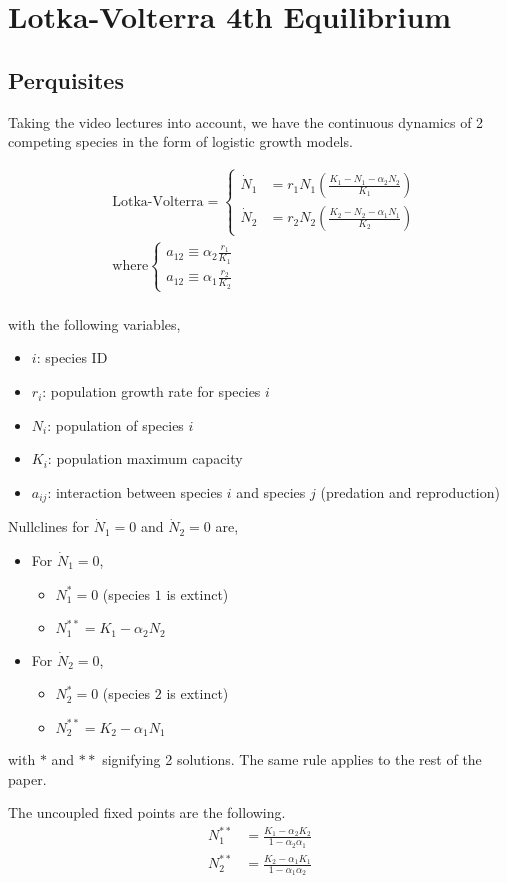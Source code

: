 \section{Lotka-Volterra 4th Equilibrium}
\subsection{Perquisites}
Taking the video lectures into account, we have the continuous dynamics of 2 competing species in the form of logistic growth models.

\begin{equation}
  \begin{split}
    &\text{Lotka-Volterra} =
    \begin{cases}
      \dot N_1 &= r_1 N_1 \left( \frac {K_1 - N_1 - \alpha_2 N_2} {K_1} \right) \\
      \dot N_2 &= r_2 N_2 \left( \frac {K_2 - N_2 - \alpha_1 N_1} {K_2} \right)
    \end{cases} \\
    &\text{where}
    \begin{cases}
      a_{12} \equiv \alpha_2 \frac {r_1} {K_1} \\
      a_{12} \equiv \alpha_1 \frac {r_2} {K_2}
    \end{cases} \\
  \end{split}
\end{equation}

with the following variables,

\begin{itemize}
  \item $i$: species ID
  \item $r_i$: population growth rate for species $i$
  \item $N_i$: population of species $i$
  \item $K_i$: population maximum capacity
  \item $a_{ij}$: interaction between species $i$ and species $j$
  (predation and reproduction)
\end{itemize}

Nullclines for $\dot N_1 = 0$ and $\dot N_2 = 0$ are,
\begin{itemize}
  \item [] For $\dot N_1 = 0$,
  \begin{itemize}
    \item $N_1^* = 0$ (species $1$ is extinct)
    \item $N_1^{**} = K_1 - \alpha_2 N_2$
  \end{itemize}
  \item [] For $\dot N_2 = 0$,
  \begin{itemize}
    \item $N_2^* = 0$ (species $2$ is extinct)
    \item $N_2^{**} = K_2 - \alpha_1 N_1$
  \end{itemize}
\end{itemize}

with $*$ and $**$ signifying 2 solutions. The same rule applies to the rest of the paper.

The uncoupled fixed points are the following.
\begin{align}
  N_1^{**} &= \frac {K_1 - \alpha_2 K_2} {1-\alpha_2 \alpha_1} \\
  N_2^{**} &= \frac {K_2 - \alpha_1 K_1} {1-\alpha_1 \alpha_2}
\end{align}
